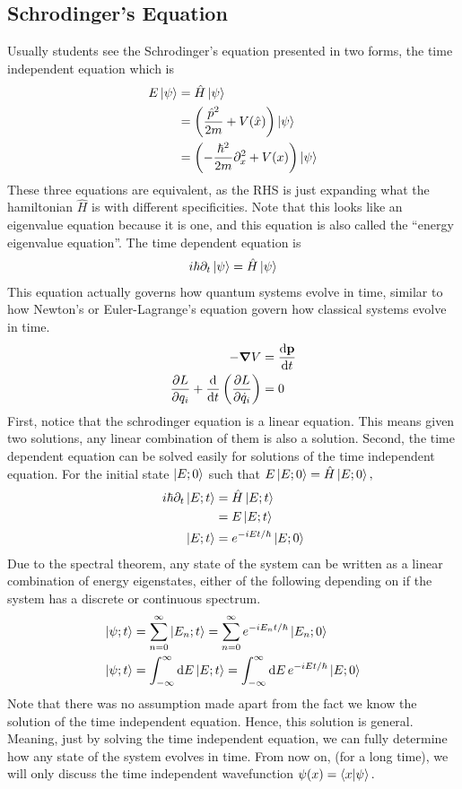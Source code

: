 \subsection{Schrodinger's Equation}
Usually students see the Schrodinger's equation presented in two forms, the time independent equation which is
\begin{align}
    E\ket\psi&=\hat H\ket\psi\\\label{time_indep_SE}
    &=\left(\frac{\hat p^2}{2m}+V(\hat x)\right)\ket\psi\\
    &=\left(-\frac{\hbar^2}{2m}\partial_x^2+V(x)\right)\ket\psi
\end{align}
These three equations are equivalent, as the RHS is just expanding what the hamiltonian \(\hat H\) is with different specificities. Note that this looks like an eigenvalue equation because it is one, and this equation is also called the ``energy eigenvalue equation''. The time dependent equation is
\begin{align}
    i\hbar\partial_t\ket\psi=\hat H\ket\psi\label{time_dep_SE}
\end{align}
This equation actually governs how quantum systems evolve in time, similar to how Newton's or Euler-Lagrange's equation govern how classical systems evolve in time.
\begin{align}
    -\grad V&=\derivative{\mathbf p}{t}\\
    \partialderivative{L}{q_i}+\derivative{}{t}\left(\partialderivative{L}{\dot q_i}\right)&=0
\end{align}
First, notice that the schrodinger equation is a linear equation. This means given two solutions, any linear combination of them is also a solution. Second, the time dependent equation can be solved easily for solutions of the time independent equation. For the initial state \(\ket{E;0}\) such that \(E\ket{E;0}=\hat H\ket{E;0},\)
\begin{align}
    i\hbar\partial_t\ket{E;t}&=\hat H\ket{E;t}\\
    &=E\ket{E;t}\\
    \ket{E;t}&=e^{-iEt/\hbar}\ket{E;0}
\end{align}
Due to the spectral theorem, any state of the system can be written as a linear combination of energy eigenstates, either of the following depending on if the system has a discrete or continuous spectrum.
\begin{align}\label{sln_bound}
    \ket{\psi;t} &= \sum_{n=0}^\infty\ket{E_n;t}=\sum_{n=0}^\infty e^{-iE_nt/\hbar}\ket{E_n;0}\\
    \ket{\psi;t} &= \int_{-\infty}^\infty\dd E\ket{E;t} = \int_{-\infty}^\infty\dd E\,e^{-iEt/\hbar}\ket{E;0}\label{sln_scattering}
\end{align}
Note that there was no assumption made apart from the fact we know the solution of the time independent equation. Hence, this solution is general. Meaning, just by solving the time independent equation, we can fully determine how any state of the system evolves in time. From now on, (for a long time), we will only discuss the time independent wavefunction \(\psi(x)=\braket{x}{\psi}.\)

